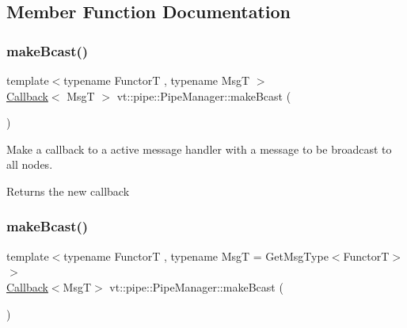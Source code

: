 \subsection{Member Function Documentation}
\mbox{\label{structvt_1_1pipe_1_1_pipe_manager_a2ea6bd5ea3e001662681b1e5a1971e9d}} 
\subsubsection{\texorpdfstring{make\+Bcast()}{makeBcast()}\hspace{0.1cm}{\footnotesize\ttfamily [1/6]}}
{\footnotesize\ttfamily template$<$typename FunctorT , typename MsgT $>$ \\
\hyperlink{namespacevt_a36db99df4c973d48b1118a293fff533f}{Callback}$<$ MsgT $>$ vt\+::pipe\+::\+Pipe\+Manager\+::make\+Bcast (\begin{DoxyParamCaption}{ }\end{DoxyParamCaption})}



Make a callback to a active message handler with a message to be broadcast to all nodes. 

\begin{DoxyReturn}{Returns}
the new callback 
\end{DoxyReturn}
\mbox{\label{structvt_1_1pipe_1_1_pipe_manager_a50e15818da3bc48ac9f129fbd30c3e31}} 
\subsubsection{\texorpdfstring{make\+Bcast()}{makeBcast()}\hspace{0.1cm}{\footnotesize\ttfamily [2/6]}}
{\footnotesize\ttfamily template$<$typename FunctorT , typename MsgT  = Get\+Msg\+Type$<$\+Functor\+T$>$$>$ \\
\hyperlink{namespacevt_a36db99df4c973d48b1118a293fff533f}{Callback}$<$MsgT$>$ vt\+::pipe\+::\+Pipe\+Manager\+::make\+Bcast (\begin{DoxyParamCaption}{ }\end{DoxyParamCaption})}



